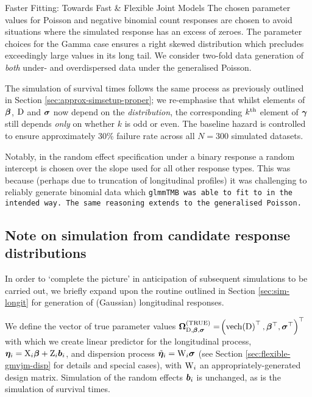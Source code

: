 \begin{chapter}{\label{cha:flexible}Faster Fitting: Towards Fast \& Flexible Joint Models}
The chosen parameter values for Poisson and negative binomial count responses are chosen to avoid situations where the simulated response has an excess of zeroes. The parameter choices for the Gamma case ensures a right skewed distribution which precludes exceedingly large values in its long tail. We consider two-fold data generation of \textit{both} under- and overdispersed data under the generalised Poisson.

The simulation of survival times follows the same process as previously outlined in Section \ref{sec:approx-simsetup-proper}; we re-emphasise that whilst elements of $\bm{\beta}$, $\mathrm{D}$ and $\bm{\sigma}$ now depend on the \textit{distribution}, the corresponding $k^{\text{th}}$ element of $\bm{\gamma}$ still depends \textit{only} on whether $k$ is odd or even. The baseline hazard is controlled to ensure approximately 30\% failure rate across all $N=300$ simulated datasets.

\begin{remark}
    Notably, in the random effect specification under a binary response a random intercept is chosen over the slope used for all other response types. This was because (perhaps due to truncation of longitudinal profiles) it was challenging to reliably generate binomial data which \tt{glmmTMB} was able to fit to in the intended way. The same reasoning extends to the generalised Poisson.
\end{remark}

\subsection{Note on simulation from candidate response distributions}\label{sec:flexible-sim-long}
In order to `complete the picture' in anticipation of subsequent simulations to be carried out, we briefly expand upon the routine outlined in Section \ref{sec:sim-longit} for generation of (Gaussian) longitudinal responses. 

We define the vector of true parameter values $\bm{\mathrm{\Omega}}_{\mathrm{D},\bm{\beta},\bm{\sigma}}^{(\mathrm{TRUE})}=\!\left(\text{vech}\!\left(\mathrm{D}\right)^\top,\bm{\beta}^\top,\bm{\sigma}^\top\right)^\top$ with which we create linear predictor for the longitudinal process, $\bm{\eta}_i=\mathrm{X}_i\bm{\beta}+\mathrm{Z}_i\bm{b}_i$, and dispersion process $\tilde{\bm{\eta}}_{i}=\mathrm{W}_i\bm{\sigma}$ (see Section \ref{sec:flexible-gmvjm-disp} for details and special cases), with $\mathrm{W}_i$ an appropriately-generated design matrix. Simulation of the random effects $\bm{b}_i$ is unchanged, as is the simulation of survival times. 


\end{chapter}
